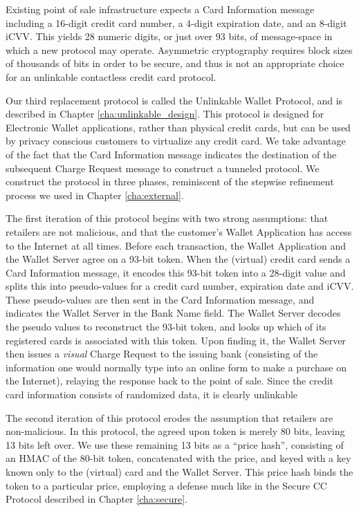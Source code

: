 Existing point of sale infrastructure expects a Card Information message including a 16-digit credit card number, a 4-digit expiration date, and an 8-digit iCVV.
This yields 28 numeric digits, or just over 93 bits, of message-space in which a new protocol may operate.
Asymmetric cryptography requires block sizes of thousands of bits in order to be secure, and thus is not an appropriate choice for an unlinkable contactless credit card protocol.


Our third replacement protocol is called the Unlinkable Wallet Protocol, and is described in Chapter \ref{cha:unlinkable_design}.
This protocol is designed for Electronic Wallet applications, rather than physical credit cards, but can be used by privacy conscious customers to virtualize any credit card.
We take advantage of the fact that the Card Information message indicates the destination of the subsequent Charge Request message to construct a tunneled protocol.
We construct the protocol in three phases, reminiscent of the stepwise refinement process we used in Chapter \ref{cha:external}.

The first iteration of this protocol begins with two strong assumptions:
    that retailers are not malicious, and that the customer's Wallet Application has access to the Internet at all times.
Before each transaction, the Wallet Application and the Wallet Server agree on a 93-bit token.
When the (virtual) credit card sends a Card Information message, it encodes this 93-bit token into a 28-digit value and splits this into pseudo-values for a credit card number, expiration date and iCVV.
These pseudo-values are then sent in the Card Information message, and indicates the Wallet Server in the Bank Name field.
The Wallet Server decodes the pseudo values to reconstruct the 93-bit token, and looks up which of its registered cards is associated with this token.
Upon finding it, the Wallet Server then issues a \emph{visual} Charge Request to the issuing bank
    (consisting of the information one would normally type into an online form to make a purchase on the Internet),
    relaying the response back to the point of sale.
Since the credit card information consists of randomized data, it is clearly unlinkable

The second iteration of this protocol erodes the assumption that retailers are non-malicious.
In this protocol, the agreed upon token is merely 80 bits, leaving 13 bits left over.
We use these remaining 13 bits as a ``price hash'',
    consisting of an HMAC of the 80-bit token, concatenated with the price, and keyed with a key known only to the (virtual) card and the Wallet Server.
This price hash binds the token to a particular price, employing a defense much like in the Secure CC Protocol described in Chapter \ref{cha:secure}.

